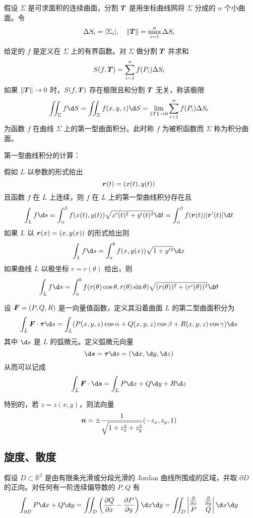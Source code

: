 假设 $\Sigma$ 是可求面积的连续曲面，分割 $\boldsymbol{T}$ 是用坐标曲线网将 $\Sigma$ 分成的 $n$ 个小曲面。令
\[ \Delta S_i = |\Sigma_i|, \quad \|\boldsymbol{T}\| = \max_{i=1}^n \Delta S_i \]


\begin{definition}[第一型曲面积分]
	给定的 $f$ 是定义在 $\Sigma$ 上的有界函数。对 $\Sigma$ 做分割 $\boldsymbol{T}$ 并求和
	\[ S(f, \boldsymbol{T}) = \sum_{i=1}^{n} f(P_i)\Delta S_i \]
	如果 $\|\boldsymbol{T}\| \to 0$ 时，$S(f, \boldsymbol{T})$ 存在极限且和分割 $\boldsymbol{T}$ 无关，称该极限
	\[ \iint_\Sigma f \d S = \iint_{\Sigma} f(x, y, z) \d S = \lim_{\|T\| \to 0} \sum_{i=1}^{n} f(P_i) \Delta S_i \]
	为函数 $f$ 在曲线 $\Sigma$ 上的第一型曲面积分。此时称 $f$ 为被积函数而 $\Sigma$ 称为积分曲面。
\end{definition}

第一型曲线积分的计算：

假如 $L$ 以参数的形式给出
\[ \boldsymbol{r}(t) = (x(t), y(t)) \]
且函数 $f$ 在 $L$ 上连续，则 $f$ 在 $L$ 上的第一型曲线积分存在且
\[ \int_L f \d s = \int_{\alpha}^{\beta}f(x(t), y(t)) \sqrt{x'(t)^2 + y'(t)^2} \d t = \int_{\alpha}^\beta f(\vbf{r}(t))|\vbf{r}'(t)| \d t \]
如果 $L$ 以 $\boldsymbol{r}(x) = (x, y(x))$ 的形式给出则
\[ \int_L f \d s = \int_{a}^{b} f(x, y(x)) \sqrt{1 + y'^2} \d x \]
如果曲线 $L$ 以极坐标 $r = r(\theta)$ 给出，则
\[ \int_L f \d s = \int_{a}^{b} f(r(\theta) \cos \theta, r(\theta) \sin \theta) \sqrt{(r(\theta))^2 + (r'(\theta))^2} \d \theta \]


\begin{definition}[第二型曲面积分]
	设 $\boldsymbol{F} = (P, Q, R)$ 是一向量值函数，定义其沿着曲面 $L$ 的第二型曲面积分为
	\[ \int_L \vbf{F} \cdot \vbf{\tau} \d s = \int_L (P(x,y,z) \cos \alpha + Q(x, y, z) \cos \beta + R(x, y, z) \cos \gamma) \d s \]
	其中 $\d s$ 是 $L$ 的弧微元。定义弧微元向量
	\[ \d \vbf{s} = \vbf{\tau} \d s = (\d x, \d y, \d z) \]
	从而可以记成
	\[ \int_L \vbf{F} \cdot \d \vbf{s} = \int_L P \d x + Q \d y + R \d z \]
\end{definition}

特别的，若 $z = z(x, y)$，则法向量
\[ \boldsymbol{n} = \pm \frac{1}{\sqrt{1 + z_x^2 + z_y^2}} (-z_x, z_y, 1) \]

\subsection{旋度、散度}

\begin{theorem}[Green 公式]
	假设 $D \subset \mathbb{R}^2$ 是由有限条光滑或分段光滑的 Jordan 曲线所围成的区域，并取 $\partial D$ 的正向。对任何有一阶连续偏导数的 $P, Q$ 有
	\[ \int_{\partial D} P \d x + Q \d y = \iint_{D} \left( \frac{\partial Q}{\partial x} - \frac{\partial P}{\partial y} \right) \d x \d y = \iint_{D} \left| \begin{matrix}
			\frac{\partial}{\partial x} & \frac{\partial}{\partial y} \\
			P                           & Q
		\end{matrix} \right| \d x \d y \]
\end{theorem}

